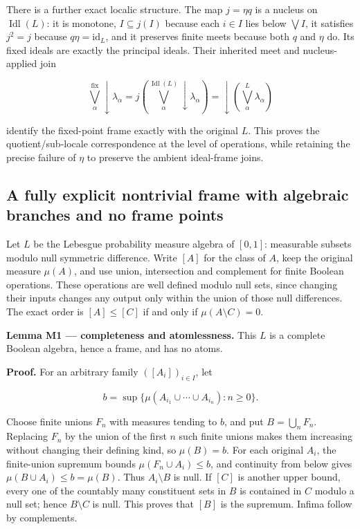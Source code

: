 There is a further exact localic structure. The map \(j=\eta q\) is a nucleus on \(\operatorname{Idl}(L)\): it is monotone, \(I\subseteq j(I)\) because each \(i\in I\) lies below \(\bigvee I\), it satisfies \(j^2=j\) because \(q\eta=\mathrm{id}_L\), and it preserves finite meets because both \(q\) and \(\eta\) do. Its fixed ideals are exactly the principal ideals. Their inherited meet and nucleus-applied join

\[
\bigvee^{\mathrm{fix}}_\alpha\downarrow\lambda_\alpha
=j\left(\bigvee^{\operatorname{Idl}(L)}_\alpha\downarrow\lambda_\alpha\right)
=\downarrow\left(\bigvee^L_\alpha\lambda_\alpha\right)
\tag{I10}
\]

identify the fixed-point frame exactly with the original \(L\). This proves the quotient/sub-locale correspondence at the level of operations, while retaining the precise failure of \(\eta\) to preserve the ambient ideal-frame joins.

\subsection{A fully explicit nontrivial frame with algebraic branches and no frame points}\label{historical-support-a-fully-explicit-nontrivial-frame-with-algebraic-branches-and-no-frame-points}

Let \(L\) be the Lebesgue probability measure algebra of \([0,1]\): measurable subsets modulo null symmetric difference. Write \([A]\) for the class of \(A\), keep the original measure \(\mu (A)\), and use union, intersection and complement for finite Boolean operations.
These operations are well defined modulo null sets, since changing their
inputs changes any output only within the union of those null differences.
The exact order is \([A]\le[C]\) if and only if
\(\mu(A\setminus C)=0\).

\textbf{Lemma M1 --- completeness and atomlessness.} This \(L\) is a complete Boolean algebra, hence a frame, and has no atoms.

\textbf{Proof.} For an arbitrary family \(([A_i])_{i\in I}\), let

\[
b=\sup\{\mu(A_{i_1}\cup\cdots\cup A_{i_n}):n\ge0\}.
\]

Choose finite unions \(F_n\) with measures tending to \(b\), and put \(B=\bigcup_n F_n\). Replacing \(F_n\) by the union of the first \(n\) such finite unions makes them increasing without changing their defining kind, so \(\mu (B)=b\). For each original \(A_i\), the finite-union supremum bounds \(\mu (F_n\cup A_i)\le b\), and continuity from below gives \(\mu (B\cup A_i)\le b=\mu (B)\). Thus \(A_i\setminus B\) is null. If \([C]\) is another upper bound, every one of the countably many constituent sets in \(B\) is contained in \(C\) modulo a null set; hence \(B\setminus C\) is null. This proves that \([B]\) is the supremum. Infima follow by complements.

